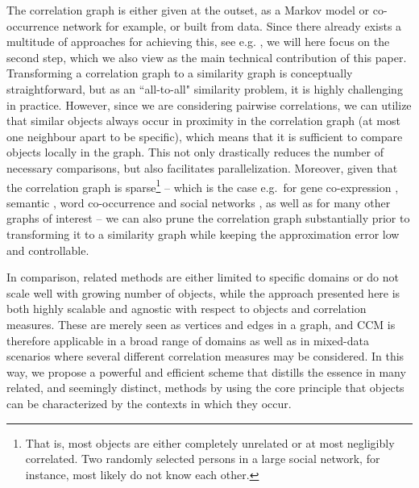 \documentclass{kais}
\begin{document}
The correlation graph is either given at the outset, as a Markov model or co-occurrence network for example, or built from data.
Since there already exists a multitude of approaches for achieving this, see e.g. \cite{Albert2002}, we will here focus on the second 
step, which we also view as the main technical contribution of this paper. Transforming a correlation graph to a similarity graph 
is conceptually straightforward, but as an ``all-to-all" similarity
problem, it is highly challenging in practice. However, since we are considering
pairwise correlations, we can utilize that similar objects always occur in proximity in the correlation graph (at most one neighbour apart to 
be specific), which means that it is sufficient to compare objects locally in the graph. This not only drastically reduces the number 
of necessary comparisons,
but also facilitates parallelization. Moreover, given that the correlation graph is sparse\footnote{That is, most objects are 
either completely unrelated or at most negligibly correlated. Two randomly selected persons in a large social network, for 
instance, most likely do not know each other.} -- which is the case e.g.\ for gene co-expression \cite{Jordan2004}, semantic
 \cite{Steyvers2005}, word co-occurrence \cite{Cancho2001} and social networks \cite{mislove2007social}, as well as for 
 many other graphs of interest \cite{Albert2002} -- we can also prune the correlation graph substantially 
prior to transforming it to a similarity graph while keeping the approximation error low and controllable.

In comparison, related methods are either limited to specific domains 
or do not scale well with growing number of objects, while the approach presented here is both highly scalable and agnostic
with respect to objects and correlation measures. These are merely seen as vertices and edges in a graph, and CCM
is therefore applicable in a broad range of domains as well as in mixed-data scenarios where several different correlation measures
may be considered. In this way, we propose a powerful and efficient scheme that distills the essence in many related, and seemingly 
distinct, methods by using the core principle that objects can be characterized by the contexts in which they occur.
\end{document}
